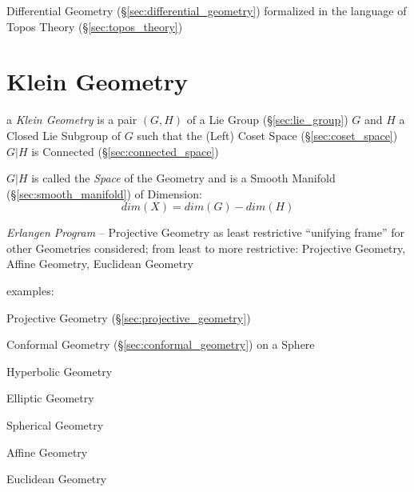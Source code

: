 Differential Geometry (\S\ref{sec:differential_geometry}) formalized in the
language of Topos Theory (\S\ref{sec:topos_theory})



\section{Klein Geometry}\label{sec:klein_geometry}


a \emph{Klein Geometry} is a pair $(G,H)$ of a Lie Group
(\S\ref{sec:lie_group}) $G$ and $H$ a Closed Lie Subgroup of $G$ such
that the (Left) Coset Space (\S\ref{sec:coset_space}) $G|H$ is
Connected (\S\ref{sec:connected_space})

$G|H$ is called the \emph{Space} of the Geometry and is a Smooth
Manifold (\S\ref{sec:smooth_manifold}) of Dimension:
\[
  dim(X) = dim(G) - dim(H)
\]

\emph{Erlangen Program} -- Projective Geometry as least restrictive
``unifying frame'' for other Geometries considered; from least to more
restrictive: Projective Geometry, Affine Geometry, Euclidean Geometry

examples: %

Projective Geometry (\S\ref{sec:projective_geometry})

Conformal Geometry (\S\ref{sec:conformal_geometry}) on a Sphere

Hyperbolic Geometry

Elliptic Geometry

Spherical Geometry

Affine Geometry

Euclidean Geometry
